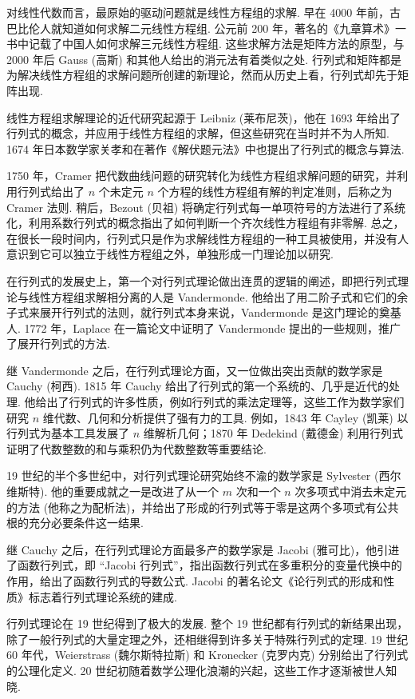 \documentclass[UTF8, 12pt, fontset=fandol, oneside]{ctexart}
\begin{document}
对线性代数而言，最原始的驱动问题就是线性方程组的求解. 早在 4000 年前，古巴比伦人就知道如何求解二元线性方程组. 公元前 200 年，著名的《九章算术》一书中记载了中国人如何求解三元线性方程组. 这些求解方法是矩阵方法的原型，与 2000 年后 Gauss (高斯) 和其他人给出的消元法有着类似之处. 行列式和矩阵都是为解决线性方程组的求解问题所创建的新理论，然而从历史上看，行列式却先于矩阵出现.

线性方程组求解理论的近代研究起源于 Leibniz (莱布尼茨)，他在 1693 年给出了行列式的概念，并应用于线性方程组的求解，但这些研究在当时并不为人所知. 1674 年日本数学家关孝和在著作《解伏题元法》中也提出了行列式的概念与算法.

1750 年，Cramer 把代数曲线问题的研究转化为线性方程组求解问题的研究，并利用行列式给出了 $n$ 个未定元 $n$ 个方程的线性方程组有解的判定准则，后称之为 Cramer 法则. 稍后，Bezout (贝祖) 将确定行列式每一单项符号的方法进行了系统化，利用系数行列式的概念指出了如何判断一个齐次线性方程组有非零解. 总之，在很长一段时间内，行列式只是作为求解线性方程组的一种工具被使用，并没有人意识到它可以独立于线性方程组之外，单独形成一门理论加以研究.

在行列式的发展史上，第一个对行列式理论做出连贯的逻辑的阐述，即把行列式理论与线性方程组求解相分离的人是 Vandermonde. 他给出了用二阶子式和它们的余子式来展开行列式的法则，就行列式本身来说，Vandermonde 是这门理论的奠基人. 1772 年，Laplace 在一篇论文中证明了 Vandermonde 提出的一些规则，推广了展开行列式的方法.

继 Vandermonde 之后，在行列式理论方面，又一位做出突出贡献的数学家是 Cauchy (柯西). 1815 年 Cauchy 给出了行列式的第一个系统的、几乎是近代的处理. 他给出了行列式的许多性质，例如行列式的乘法定理等，这些工作为数学家们研究 $n$ 维代数、几何和分析提供了强有力的工具. 例如，1843 年 Cayley (凯莱) 以行列式为基本工具发展了 $n$ 维解析几何；1870 年 Dedekind (戴德金) 利用行列式证明了代数整数的和与乘积仍为代数整数等重要结论.

19 世纪的半个多世纪中，对行列式理论研究始终不渝的数学家是 Sylvester (西尔维斯特). 他的重要成就之一是改进了从一个 $m$ 次和一个 $n$ 次多项式中消去未定元的方法 (他称之为配析法)，并给出了形成的行列式等于零是这两个多项式有公共根的充分必要条件这一结果.

继 Cauchy 之后，在行列式理论方面最多产的数学家是 Jacobi (雅可比)，他引进了函数行列式，即 ``Jacobi 行列式''，指出函数行列式在多重积分的变量代换中的作用，给出了函数行列式的导数公式. Jacobi 的著名论文《论行列式的形成和性质》标志着行列式理论系统的建成.

行列式理论在 19 世纪得到了极大的发展. 整个 19 世纪都有行列式的新结果出现，除了一般行列式的大量定理之外，还相继得到许多关于特殊行列式的定理. 19 世纪 60 年代，Weierstrass (魏尔斯特拉斯) 和 Kronecker (克罗内克) 分别给出了行列式的公理化定义. 20 世纪初随着数学公理化浪潮的兴起，这些工作才逐渐被世人知晓.
\end{document}
